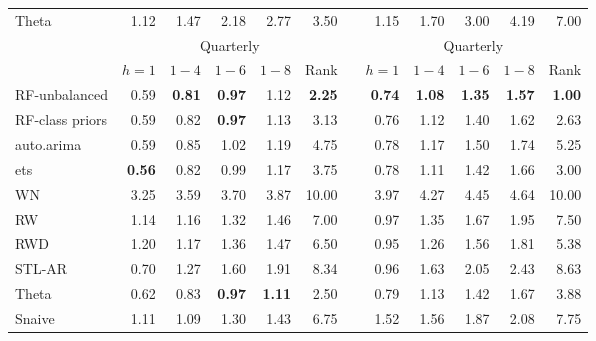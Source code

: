 \documentclass[11pt,a4paper,]{article}
\theoremstyle{definition}
\theoremstyle{definition}
\theoremstyle{definition}
\theoremstyle{remark}
\begin{document}
\begin{table}[!htbp]
\begin{tabular}{lrrrrrrrrrrr}
Theta                &       1.12 &       1.47 &       2.18 &       2.77 &       3.50 &            &       1.15 &       1.70 &       3.00 &       4.19 &       7.00 \\\cmidrule(lr){2-6} \cmidrule(lr){8-12}
           &                                 \multicolumn{ 5}{c}{Quarterly} &            &                                 \multicolumn{ 5}{c}{Quarterly} \\
                     &    $h=1$   &    $1-4$   &     $1-6$  &     $1-8$  &      Rank  &            &     $h=1$  &    $1-4$   &     $1-6$  &     $1-8$  &   Rank \\\cmidrule(lr){2-6} \cmidrule(lr){8-12}
RF-unbalanced        &       0.59 & {\bf 0.81} & {\bf 0.97} &       1.12 & {\bf 2.25} &            & {\bf 0.74} & {\bf 1.08} & {\bf 1.35} & {\bf 1.57} & {\bf 1.00} \\
RF-class priors      &       0.59 & 0.82 &       {\bf 0.97} &       1.13 &  3.13 &            &       0.76 &       1.12 &       1.40 &       1.62 &       2.63 \\
auto.arima           &       0.59 &       0.85 &       1.02 &       1.19 &       4.75 &            &       0.78 &       1.17 &       1.50 &       1.74 &       5.25 \\
ets                  & {\bf 0.56} &       0.82 &       0.99 &       1.17 &       3.75 &            &       0.78 &       1.11 &       1.42 &       1.66 &       3.00 \\
WN                   &       3.25 &       3.59 &       3.70 &       3.87 &      10.00 &            &       3.97 &       4.27 &       4.45 &       4.64 &      10.00 \\
RW                   &       1.14 &       1.16 &       1.32 &       1.46 &       7.00 &            &       0.97 &       1.35 &       1.67 &       1.95 &       7.50 \\
RWD                  &       1.20 &       1.17 &       1.36 &       1.47 &       6.50 &            &       0.95 &       1.26 &       1.56 &       1.81 &       5.38 \\
STL-AR               &       0.70 &       1.27 &       1.60 &       1.91 &       8.34 &            &       0.96 &       1.63 &       2.05 &       2.43 &       8.63 \\
Theta                &       0.62 &       0.83 &       {\bf 0.97} & {\bf 1.11} &  2.50 &            &       0.79 &       1.13 &       1.42 &       1.67 &       3.88 \\
Snaive               &       1.11 &       1.09 &       1.30 &       1.43 &       6.75 &            &       1.52 &       1.56 &       1.87 &       2.08 &       7.75 \\\cmidrule(lr){2-6} \cmidrule(lr){8-12}

\end{tabular}
\end{table}
\end{document}
